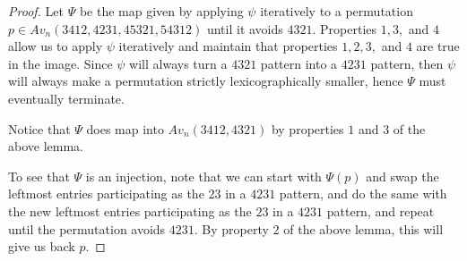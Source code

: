 \documentclass[11pt]{amsart}
\theoremstyle{remark}
\numberwithin{equation}{section}
\begin{document}
\begin{proof}
    Let $\Psi$ be the map given by applying $\psi$ iteratively to a permutation $p\in Av_n(3412,4231,45321,54312)$ until it avoids $4321$. Properties $1,3,$ and $4$ allow us to apply $\psi$ iteratively and maintain that properties $1,2,3,$ and $4$ are true in the image. Since $\psi$ will always turn a $4321$ pattern into a $4231$ pattern, then $\psi$ will always make a permutation strictly lexicographically smaller, hence $\Psi$ must eventually terminate.

    Notice that $\Psi$ does map into $Av_n(3412,4321)$ by properties $1$ and $3$ of the above lemma.

    To see that $\Psi$ is an injection, note that we can start with $\Psi(p)$ and swap the leftmost entries participating as the $23$ in a $4231$ pattern, and do the same with the new leftmost entries participating as the $23$ in a $4231$ pattern, and repeat until the permutation avoids $4231$. By property $2$ of the above lemma, this will give us back $p$. 
\end{proof}
\end{document}
